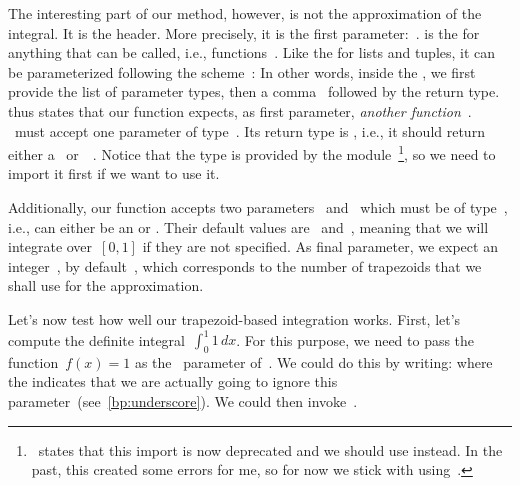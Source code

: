 The interesting part of our  method, however, is not the approximation of the integral.
It is the header.
More precisely, it is the first parameter:~.
 is the  for anything that can be called, i.e., functions~\cite{PSF:P3D:TPSL:ACO}.
Like the  for lists and tuples, it can be parameterized following the scheme~\cite{PEP612}:%
%
%
%
In other words, inside the , we first provide the list of parameter types, then a comma~\pythonil{,} followed by the return type.
 thus states that our function expects, as first parameter, \emph{another function}~.
~must accept one parameter of type~.
Its return type is , i.e., it should return either a~ or~~\cite{PEP604}.
Notice that the type  is provided by the module~\footnote{%
\cite{PSF:P3D:TPSL:ACO}~states that this import is now deprecated and we should use  instead. %
In the past, this created some errors for me, so for now we stick with using~.}, %
so we need to import it first if we want to use it.%
%
\begin{sloppypar}%
Additionally, our  function accepts two parameters~ and~ which must be of type~, i.e., can either be an  or .
Their default values are~ and~, meaning that we will integrate over~$[0,1]$ if they are not specified.
As final parameter, we expect an integer~, by default~, which corresponds to the number of trapezoids that we shall use for the approximation.%
\end{sloppypar}%
%
Let's now test how well our trapezoid-based integration works.
First, let's compute the definite integral~$\int_0^1 1\,dx$.
For this purpose, we need to pass the function~$f(x)=1$ as the~ parameter of~.
We could do this by writing:%
%
%
%
where the \pythonil{_}\pythonIdx{\_} indicates that we are actually going to ignore this parameter~(see~\cref{bp:underscore}).
We could then invoke~.

